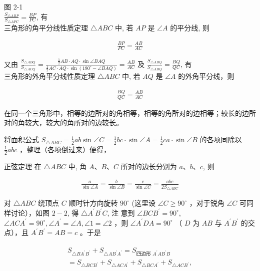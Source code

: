 \documentclass[10pt]{article}
\begin{document}
图 2-1\\
$\frac{S_{\triangle A B P}}{S_{\triangle A P C}}=\frac{B P}{P C}$, 有\\
三角形的角平分线性质定理 $\triangle A B C$ 中, 若 $A P$ 是 $\angle A$ 的平分线, 则

\begin{align*}
\frac{B P}{P C}=\frac{A B}{A C} 
\end{align*}

又由 $\frac{S_{\triangle A B Q}}{S_{\triangle A C Q}}=\frac{\frac{1}{2} A B \cdot A Q \cdot \sin \angle B A Q}{\frac{1}{2} A C \cdot A Q \cdot \sin \left(180^{\circ}-\angle B A Q\right)}=\frac{A B}{A C}$ 及 $\frac{S_{\triangle A B Q}}{S_{\triangle A B Q}}=\frac{B Q}{Q C}$, 有\\
三角形的外角平分线性质定理 $\triangle A B C$ 中, 若 $A Q$ 是 $\angle A$ 的外角平分线，则

\begin{align*}
\frac{B Q}{Q C}=\frac{A B}{A C} \tag{2-5}
\end{align*}

在同一个三角形中，相等的边所对的角相等，相等的角所对的边相等；较长的边所对的角较大，较大的角所对的边较长。

将面积公式 $S_{\triangle A B C}=\frac{1}{2} a b \sin \angle C=\frac{1}{2} b c \cdot \sin \angle A=\frac{1}{2} c a \cdot \sin \angle B$ 的各项同除以 $\frac{1}{2} a b c$ ，整理（各项倒过来）便得，

正弦定理 在 $\triangle A B C$ 中, 角 $A 、 B 、 C$ 所对的边长分别为 $a 、 b 、 c$, 则

\begin{align*}
\frac{a}{\sin \angle A}=\frac{b}{\sin \angle B}=\frac{c}{\sin \angle C}=\frac{a b c}{2 S_{\triangle A B C}} \tag{2-6}
\end{align*}

对 $\triangle A B C$ 绕顶点 $C$ 顺时针方向旋转 $90^{\circ}$ (这里设 $\angle C \geqslant 90^{\circ}$ ，对于锐角 $\angle C$ 可同样讨论），如图 $2-2$, 得 $\triangle A^{\prime} B^{\prime} C$, 注 意到 $\angle B C B^{\prime}=90^{\circ}$, $\angle A C A^{\prime}=90^{\circ}, \angle A^{\prime}=\angle A, \angle 1=\angle 2$ ，则 $\angle A^{\prime} D A=90^{\circ}$ （ $D$ 为 $A B$ 与 $A^{\prime} B^{\prime}$ 的交点），且 $A^{\prime} B^{\prime}=A B=c$ 。于是

\begin{align*}
\begin{gathered}
S_{\triangle B A^{\prime} B^{\prime}}+S_{\triangle A B^{\prime} A^{\prime}}=S_{\text {四边形 } A^{\prime} A B^{\prime} B} \\
=S_{\triangle B C B^{\prime}}+S_{\triangle A C A^{\prime}}+S_{\triangle B C A^{\prime}}+S_{\triangle A C B^{\prime}},
\end{gathered}
\end{align*}
\end{document}
